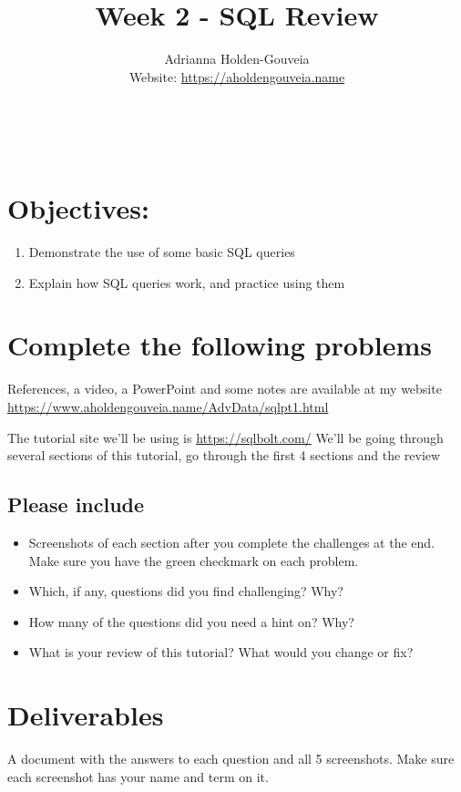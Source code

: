 \documentclass[12pt]{article}
\title{Week 2 - SQL Review}
\author{
        Adrianna Holden-Gouveia \\
        Website: \url{https://aholdengouveia.name}\\ 
        \date{\vspace{-5ex}}
        \faLinkedin{: aholdengouveia} \\
        \faGithub {: aholdengouveia} \\
        }
\begin{document}
    

\maketitle


\section*{Objectives:}
\begin{enumerate}
    \item Demonstrate the use of some basic SQL queries
    \item Explain how SQL queries work, and practice using them
\end{enumerate}
\section*{Complete the following problems}

References, a video, a PowerPoint and some notes are available at my website
\url {https://www.aholdengouveia.name/AdvData/sqlpt1.html}

The tutorial site we'll be using is \url{https://sqlbolt.com/}
We'll be going through several sections of this tutorial, go through the first 4 sections and the review

\subsection*{Please include}
    \begin{itemize}
        \item Screenshots of each section after you complete the challenges at the end.  Make sure you have the green checkmark on each problem.
        \item Which, if any, questions did you find challenging? Why?
        \item How many of the questions did you need a hint on? Why?
        \item What is your review of this tutorial? What would you change or fix?
    \end{itemize}



\section*{Deliverables}
A document with the answers to each question and all 5 screenshots. Make sure each screenshot has your name and term on it.
\end{document}

